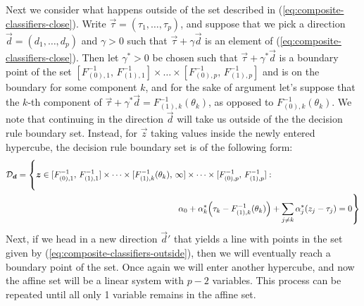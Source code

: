 Next we consider what happens outside of the set described in
(\ref{eq:composite-classifiers-close}).  Write
$\vec{\tau} = (\tau_1, \dots, \tau_p)$, and suppose that we pick a direction
$\vec{d} = (d_1, \dots, d_p)$ and $\gamma > 0$ such that
$\vec{\tau} + \gamma \vec{d}$ is an element of
(\ref{eq:composite-classifiers-close}).  Then let $\gamma^{*} > 0$ be chosen
such that $\vec{\tau} + \gamma^{*} \vec{d}$ is a boundary point of the set
$[F_{(0),1}^{-1},\, F_{(1),1}^{-1}] \times \dots \times [F_{(0),p}^{-1},\,
F_{(1),p}^{-1}]$ and is on the boundary for some component $k$, and for the sake
of argument let's suppose that the $k$-th component of
$\vec{\tau} + \gamma^{*} \vec{d} = F_{(1),k}^{-1}(\theta_k)$, as opposed to
$F_{(0),k}^{-1}(\theta_k)$.  We note that continuing in the direction $\vec{d}$
will take us outside of the the decision rule boundary set.  Instead, for
$\vec{z}$ taking values inside the newly entered hypercube, the decision rule
boundary set is of the following form:
\begin{equation}
  \label{eq:composite-classifiers-outside}
  \begin{split}
    \mathcal{D}_{\vec{d}} = \left\{
      \vec{z} \in [F_{(0),1}^{-1},\, F_{(1),1}^{-1}]
      \times \dots \times
      [F_{(1),k}^{-1}(\theta_k),\, \infty]
      \times \dots \times
      [F_{(0),p}^{-1},\, F_{(1),p}^{-1}] :
      \phantom{\hspace{30mm} \sum_{j=1}^p}
    \right.  \\
    \left.
      \hfill
      \alpha_0 +
      \alpha_k^{*} \Big(\tau_k - F_{(1),k}^{-1}(\theta_k)\Big) +
      \sum_{j\ne k} \alpha_j^{*} (z_j - \tau_j) = 0
    \right\}
  \end{split}
\end{equation}
Next, if we head in a new direction $\vec{d}'$ that yields a line with points in
the set given by (\ref{eq:composite-classifiers-outside}), then we will
eventually reach a boundary point of the set.  Once again we will enter another
hypercube, and now the affine set will be a linear system with $p - 2$
variables.  This process can be repeated until all only 1 variable remains in
the affine set.

